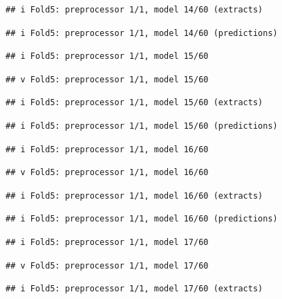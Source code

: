 \documentclass[
]{article}
\begin{document}
\begin{verbatim}
## i Fold5: preprocessor 1/1, model 14/60 (extracts)
\end{verbatim}

\begin{verbatim}
## i Fold5: preprocessor 1/1, model 14/60 (predictions)
\end{verbatim}

\begin{verbatim}
## i Fold5: preprocessor 1/1, model 15/60
\end{verbatim}

\begin{verbatim}
## v Fold5: preprocessor 1/1, model 15/60
\end{verbatim}

\begin{verbatim}
## i Fold5: preprocessor 1/1, model 15/60 (extracts)
\end{verbatim}

\begin{verbatim}
## i Fold5: preprocessor 1/1, model 15/60 (predictions)
\end{verbatim}

\begin{verbatim}
## i Fold5: preprocessor 1/1, model 16/60
\end{verbatim}

\begin{verbatim}
## v Fold5: preprocessor 1/1, model 16/60
\end{verbatim}

\begin{verbatim}
## i Fold5: preprocessor 1/1, model 16/60 (extracts)
\end{verbatim}

\begin{verbatim}
## i Fold5: preprocessor 1/1, model 16/60 (predictions)
\end{verbatim}

\begin{verbatim}
## i Fold5: preprocessor 1/1, model 17/60
\end{verbatim}

\begin{verbatim}
## v Fold5: preprocessor 1/1, model 17/60
\end{verbatim}

\begin{verbatim}
## i Fold5: preprocessor 1/1, model 17/60 (extracts)
\end{verbatim}
\end{document}
